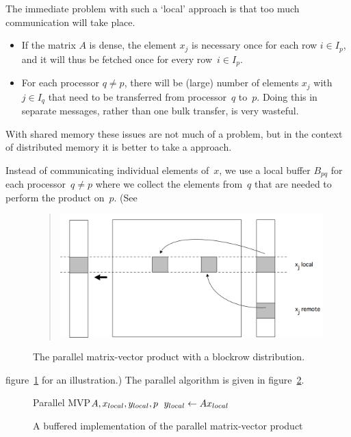 The immediate problem with such a
`local' approach is that too much communication will take place.
\begin{itemize}
\item If the matrix $A$ is dense, the element $x_j$ is necessary once
  for each row $i\in I_p$, and it will thus be fetched once for every
  row~$i\in I_p$.
\item For each processor $q\not=p$, there will be (large) number of
  elements $x_j$ with $j\in I_q$ that need to be transferred from
  processor~$q$ to~$p$. Doing this in separate messages, rather than
  one bulk transfer, is very wasteful.
\end{itemize}
With shared memory these issues are not much of a problem, but in the
context of distributed memory it is better to take a
 approach.

Instead of communicating individual elements of~$x$, we use a local
buffer $B_{pq}$ for each processor~$q\not=p$ where we collect the
elements from~$q$ that are needed to perform the product on~$p$. (See
\begin{figure}
  \begin{quote}
    \includegraphics[scale=.12]{graphics/distmvp}
  \end{quote}
  \caption{The parallel matrix-vector product with a blockrow
    distribution.}
  \label{fig:distmvp2}
\end{figure}
figure~\ref{fig:distmvp2} for an illustration.) The parallel algorithm
is given in figure~\ref{fig:buffer-pmvp}.
\begin{figure}
\begin{displayprocedure}{Parallel MVP}{$A,x_{\mathrm\scriptstyle local},y_{\mathrm\scriptstyle local},p$}
  $y_{\mathrm\scriptstyle local}\leftarrow A x_{\mathrm\scriptstyle local}$\\
\end{displayprocedure}
  \caption{A buffered implementation of the parallel matrix-vector
    product}
  \label{fig:buffer-pmvp}
\end{figure}

